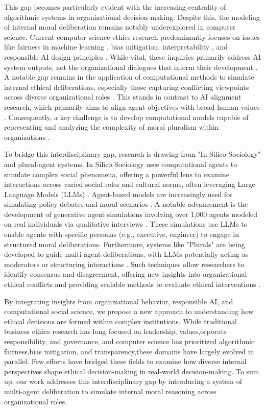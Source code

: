 This gap becomes particularly evident with the increasing centrality of algorithmic systems in organizational decision-making. Despite this, the modeling of internal moral deliberation remains notably underexplored in computer science. Current computer science ethics research predominantly focuses on issues like fairness in machine learning \cite{mehrabi2022survey}, bias mitigation\cite{bianchi2023easily}, interpretability \cite{doshi-velez2017towards}, and responsible AI design principles \cite{ leslieunderstanding, sandersonimplementing,sekrstai,sadek2025challenges}. While vital, these inquiries primarily address AI system outputs, not the organizational dialogues that inform their development \cite{madaio_etal_2020}. A notable gap remains in the application of computational methods to simulate internal ethical deliberations, especially those capturing conflicting viewpoints across diverse organizational roles \cite{herdel2024exploregen}. This stands in contrast to AI alignment research, which primarily aims to align agent objectives with broad human values \cite{gabrielartificial}. Consequently, a key challenge is to develop computational models capable of representing and analyzing the complexity of moral pluralism within organizations \cite{sekrstai}.

To bridge  this interdisciplinary gap, research is drawing from "In Silico Sociology" and plural-agent systems. In Silico Sociology uses computational agents to simulate complex social phenomena, offering a powerful lens to examine interactions across varied social roles and cultural norms, often leveraging Large Language Models (LLMs) \cite{kozlowski_etal_2024, gilbert_2022}. Agent-based models are increasingly used for simulating policy debates and moral scenarios \cite{ shults_etal_2020}. A notable advancement is the development of generative agent simulations involving over 1,000 agents modeled on real individuals via qualitative interviews \cite{park_etal_2024_1000}. These simulations use LLMs to enable agents with specific personas (e.g., executive, engineer) to engage in structured moral deliberations. Furthermore, systems like "Plurals" are being developed to guide multi-agent deliberations, with LLMs potentially acting as moderators or structuring interactions \cite{ashkinaze_etal_2025}. Such techniques allow researchers to identify consensus and disagreement, offering new insights into organizational ethical conflicts and providing scalable methods to evaluate ethical interventions \cite{rao_etal_2025_riskrags}.

By integrating  insights from organizational behavior, responsible AI, and computational social science, we propose a new approach to understanding how ethical decisions are formed within complex institutions. While traditional business ethics research has long focused on leadership, values,orporate responsibility, and governance, and computer science has prioritized algorithmic fairness,bias mitigation, and transparency,these domains have largely evolved in parallel. Few efforts have bridged these fields to examine how diverse internal perspectives shape ethical decision-making in real-world decision-making. To sum up, our work addresses this interdisciplinary gap by introducing a system of multi-agent deliberation to simulate internal moral reasoning across organizational roles.
